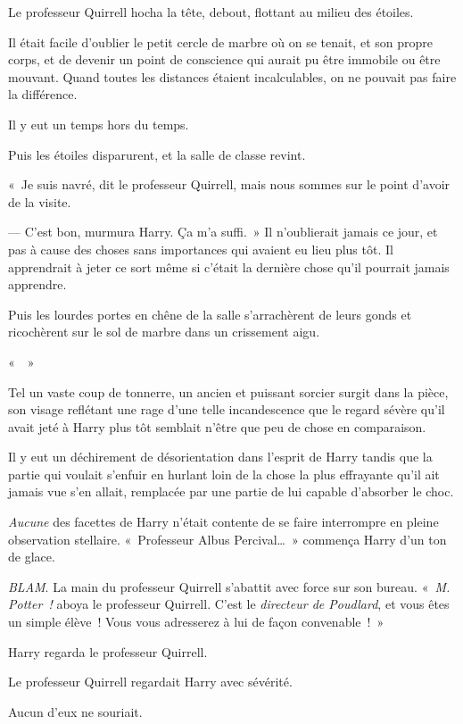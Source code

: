 Le professeur Quirrell hocha la tête, debout, flottant au milieu des étoiles.

Il était facile d'oublier le petit cercle de marbre où on se tenait, et son propre corps, et de devenir un point de conscience qui aurait pu être immobile ou être mouvant.
Quand toutes les distances étaient incalculables, on ne pouvait pas faire la différence.

Il y eut un temps hors du temps.

Puis les étoiles disparurent, et la salle de classe revint.

«~Je suis navré, dit le professeur Quirrell, mais nous sommes sur le point d'avoir de la visite.

--- C'est bon, murmura Harry.
Ça m'a suffi.~»
Il n'oublierait jamais ce jour, et pas à cause des choses sans importances qui avaient eu lieu plus tôt.
Il apprendrait à jeter ce sort même si c'était la dernière chose qu'il pourrait jamais apprendre.

Puis les lourdes portes en chêne de la salle s'arrachèrent de leurs gonds et ricochèrent sur le sol de marbre dans un crissement aigu.

«~~»

Tel un vaste coup de tonnerre, un ancien et puissant sorcier surgit dans la pièce, son visage reflétant une rage d'une telle incandescence que le regard sévère qu'il avait jeté à Harry plus tôt semblait n'être que peu de chose en comparaison.

Il y eut un déchirement de désorientation dans l'esprit de Harry tandis que la partie qui voulait s'enfuir en hurlant loin de la chose la plus effrayante qu'il ait jamais vue s'en allait, remplacée par une partie de lui capable d'absorber le choc.

\emph{Aucune} des facettes de Harry n'était contente de se faire interrompre en pleine observation stellaire.
«~Professeur Albus Percival…~»
commença Harry d'un ton de glace.

\emph{BLAM}.
La main du professeur Quirrell s'abattit avec force sur son bureau.
«~\emph{M. Potter~!} aboya le professeur Quirrell.
C'est le \emph{directeur de Poudlard}, et vous êtes un simple élève~!
Vous vous adresserez à lui de façon convenable~!~»

Harry regarda le professeur Quirrell.

Le professeur Quirrell regardait Harry avec sévérité.

Aucun d'eux ne souriait.


